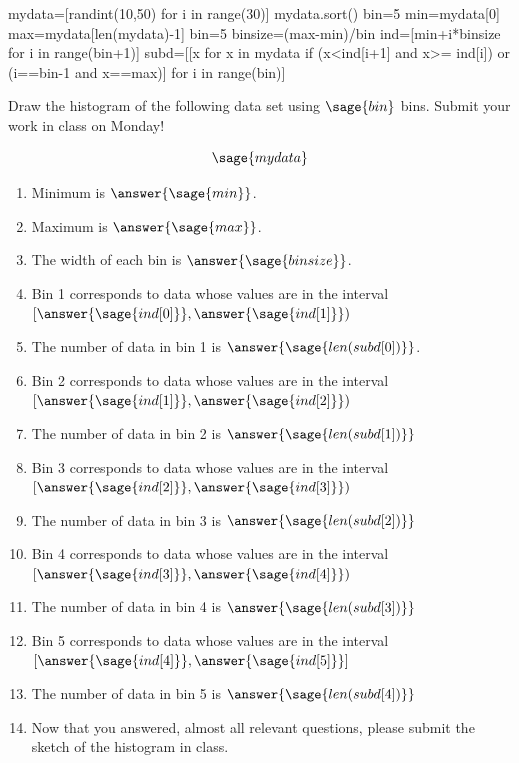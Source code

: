 \documentclass{ximera}
\begin{document}
\begin{problem}
\begin{sagesilent}
mydata=[randint(10,50) for i in range(30)]
mydata.sort()
bin=5
min=mydata[0]
max=mydata[len(mydata)-1]
bin=5
binsize=(max-min)/bin
ind=[min+i*binsize for i in range(bin+1)]
subd=[[x for x in mydata if (x<ind[i+1] and x>= ind[i]) or (i==bin-1 and x==max)] for i in range(bin)]
\end{sagesilent}

Draw the histogram of the following data set using $\sage{bin}$ bins. Submit your work in class on Monday!

$$\sage{mydata}$$

\begin{enumerate}
    \item Minimum is $\answer{\sage{min}}$.
    \item Maximum is $\answer{\sage{max}}$.
    \item The width of each bin is $\answer{\sage{binsize}}$.
    \item Bin 1 corresponds to data whose values are in the interval 
    $[\answer{\sage{ind[0]}}, \answer{\sage{ind[1]}})$
    \item The number of data in bin 1 is $\answer{\sage{len(subd[0])}}$.
    \item Bin 2 corresponds to data whose values are in the interval 
    $[\answer{\sage{ind[1]}}, \answer{\sage{ind[2]}})$
    \item The number of data in bin 2 is $\answer{\sage{len(subd[1])}}$
    \item Bin 3 corresponds to data whose values are in the interval 
    $[\answer{\sage{ind[2]}}, \answer{\sage{ind[3]}})$
    \item The number of data in bin 3 is $\answer{\sage{len(subd[2])}}$
    \item Bin 4 corresponds to data whose values are in the interval 
    $[\answer{\sage{ind[3]}}, \answer{\sage{ind[4]}})$
    \item The number of data in bin 4 is $\answer{\sage{len(subd[3])}}$
    \item Bin 5 corresponds to data whose values are in the interval 
    $[\answer{\sage{ind[4]}}, \answer{\sage{ind[5]}}]$
    \item The number of data in bin 5 is $\answer{\sage{len(subd[4])}}$
    \item Now that you answered, almost all relevant questions, please submit the sketch of the histogram in class.
\end{enumerate}
\end{problem}
\end{document}
